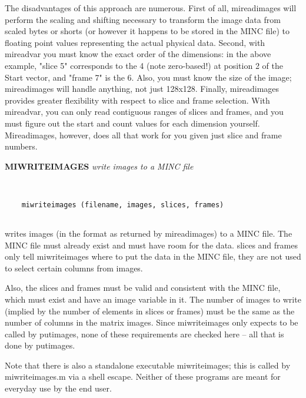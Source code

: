    The disadvantages of this approach are numerous.  First of all,
   mireadimages will perform the scaling and shifting necessary to
   transform the image data from scaled bytes or shorts (or however it
   happens to be stored in the MINC file) to floating point values
   representing the actual physical data.  Second, with mireadvar you
   must know the exact order of the dimensions: in the above example,
   "slice 5" corresponds to the 4 (note zero-based!) at position 2 of
   the Start vector, and "frame 7" is the 6.  Also, you must know the
   size of the image; mireadimages will handle anything, not just
   128x128.  Finally, mireadimages provides greater flexibility with
   respect to slice and frame selection.  With mireadvar, you can only
   read contiguous ranges of slices and frames, and you must figure
   out the start and count values for each dimension yourself.
   Mireadimages, however, does all that work for you given just slice
   and frame numbers.
\endfunchelp


{\large\bf MIWRITEIMAGES} {\em  write images to a MINC file}
\begin{verbatim}


    miwriteimages (filename, images, slices, frames)


\end{verbatim}

   writes images (in the format as returned by mireadimages) to a MINC
   file.  The MINC file must already exist and must have room for the 
   data.  slices and frames only tell miwriteimages where to put the data
   in the MINC file, they are not used to select certain columns from images.
 
   Also, the slices and frames must be valid and consistent with the MINC
   file, which must exist and have an image variable in it.  The number
   of images to write (implied by the number of elements in slices or frames)
   must be the same as the number of columns in the matrix images.  Since
   miwriteimages only expects to be called by putimages, none of these
   requirements are checked here -- all that is done by putimages.
 
   Note that there is also a standalone executable miwriteimages; this 
   is called by miwriteimages.m via a shell escape.  Neither of these
   programs are meant for everyday use by the end user.
\endfunchelp


